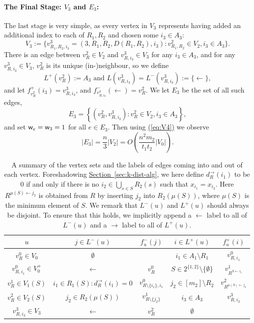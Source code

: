 \documentclass{theoretics}
\newcommand{\eq}[1]{\hyperref[eq:#1]{(\ref*{eq:#1})}}
\renewcommand{\sec}[1]{\hyperref[sec:#1]{Section~\ref*{sec:#1}}}
\renewcommand{\>}{\rangle}
\newcommand{\<}{\langle}
\renewcommand{\(}{\left(}
\renewcommand{\)}{\right)}
\def\w{{\sf w}}
\begin{document}
\paragraph{The Final Stage: $V_3$ and $E_3$:} The last stage is very simple, as every vertex in $V_3$ represents having added an additional index to each of $R_1, R_2$ and chosen some $i_3 \in A_3$:
$$V_3:=\{v^3_{R_1,R_2,i_3}=(3,R_1,R_2,D(R_1,R_2),i_3):v^2_{R_1,R_2}\in V_2, i_3\in A_3\}.$$
There is an edge between $v^2_{R}\in V_2$ and $v^3_{R,i_3}\in V_3$ for any $i_3\in A_3$, and for any $v^3_{R,i_3}\in V_3$, $v^2_{R}$ is its unique (in-)neighbour, so we define
$$L^+(v_{R}^2):=A_3
\mbox{ and }
L(v_{R,i_3}^3)=L^-(v_{R,i_3}^3):=\{\leftarrow\},$$
and let $f^+_{v_{R}^2}(i_3) = v_{R,i_3}^3$, and $f^-_{v_{R,i_3}^3}(\leftarrow) = v_{R}^2$. We let $E_3$ be the set of all such edges,
$$E_3=\left\{\left(v^2_{R},v^3_{R,i_3}\right):v^2_{R}\in V_2, i_3 \in A_3\right\},$$
and set $\w_e = \w_3=1$ for all $e \in E_3$. Then using \eq{V4} we observe
\begin{equation}
|E_3|=\frac{n}{3}|V_2|= O\left(\frac{n^2m_2}{t_1t_2}|V_0|\right).\label{eq:E4}
\end{equation}

\begin{table}
\renewcommand{\arraystretch}{1.5}
\centering
\begin{tabular}{ |c|c|c|c|c|}
\hline
 $u$ & $j\in L^-(u)$ & $f^-_u(j)$ & $i\in L^+(u)$ & $f^+_u(i)$\\
\hline
\hline
$v^0_{R}\in V_0$ & $\emptyset$ & & $ i_1\in A_1\setminus R_1$ & $v_{R,i_1}^0$\\
\hline
$v^0_{R,i_1}\in V_0^+$ & $\leftarrow$ & $v_R^0$ & $S\in 2^{\{1,2\}} \setminus \{\emptyset\}$ & $v_{R^{S\leftarrow i_1}}^1$\\
\hline
$v^1_{R}\in V_1(S)$ & $i_1\in R_1(S):d_R^{\rightarrow}(i_1)=0$ & $v_{R\setminus\{i_1\},i_1}^0$ & $j_2\in [m_2]\setminus R_2$ & $v_{R^{\mu(S)\leftarrow j_2}}^2$\\
\hline
$v^2_{R}\in V_2(S)$ & $j_2\in R_2(\mu(S))$ & $v_{R\setminus\{j_2\}}^1$ &  $i_3\in A_3$ & $v_{R,i_3}^3$\\
\hline
$v^3_{R,i_3}\in V_3$ & $\leftarrow$ & $v_{R}^{2}$ & $\emptyset$ &\\
\hline
\end{tabular}
\caption{A summary of the vertex sets and the labels of edges coming into and out of each vertex. 
Foreshadowing \sec{k-dist-alg}, we here define $d_R^{\rightarrow}(i_1)$ to be 0 if and only if there is no $i_2\in \bigcup_{s\in S}R_2(s)$ such that $x_{i_1}=x_{i_2}$. Here $R^{\mu(S)\leftarrow j_2}$ is obtained from $R$ by inserting $j_2$ into $R_2(\mu(S))$, where $\mu(S)$ is the minimum element of $S$. We remark that $L^-(u)$ and $L^+(u)$ should always be disjoint. To ensure that this holds, we implicitly append a $\leftarrow$ label to all of $L^-(u)$ and a $\rightarrow$ label to all of $L^+(u)$.
}\label{tab:3-dist-index-sets}
\end{table}
\end{document}
